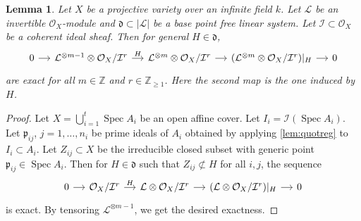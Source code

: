 \documentclass[12pt]{amsart}
\theoremstyle{plain}
\newtheorem{lemma}[theorem]{Lemma}
\theoremstyle{definition}
\numberwithin{equation}{section}
\def\Z{{\mathbb Z}}
\def\p{{ \mathfrak{p}}}
\def\dd{{ \mathfrak{d}}}
\def\O{{ \mathcal{O}}}
\def\I{{ \mathcal{I}}}
\DeclareMathOperator{\Spec}{Spec}
\begin{document}
\begin{lemma}\label{lem:generalhpsecexact}
Let $X$ be a projective variety over an infinite field $k$.
Let $ \mathcal{L}$ be an invertible $\O_{X}$-module and
$\dd \subset | \mathcal{L}|$ be a base point free linear system.
Let $\I \subset \O_{X}$ be a coherent ideal sheaf.
Then for general $H \in \dd$, 
\begin{equation}
\begin{tikzcd}[column sep=small] 
0 \arrow[r] & \mathcal{L}^{\otimes m-1} \otimes \O_{X}/\I^{r} \arrow[r,"H"] &  \mathcal{L}^{\otimes m} \otimes \O_{X}/\I^{r}  \arrow[r] &
(\mathcal{L}^{\otimes m} \otimes \O_{X}/\I^{r} )|_{H} \arrow[r]& 0
\end{tikzcd}
\end{equation}
are exact for all $m \in \Z$ and $r \in \Z_{\geq 1}$.
Here the second map is the one induced by $H$.
\end{lemma}
\begin{proof}
Let $X = \bigcup_{i=1}^{t}\Spec A_{i}$ be an open affine cover.
Let $I_{i} = \I(\Spec A_{i})$.
Let $\p_{ij}$, $j=1,\dots, n_{i}$ be prime ideals of $A_{i}$ obtained by
applying \cref{lem:quotreg} to $I_{i} \subset A_{i}$.
Let $Z_{ij} \subset X$ be the irreducible closed subset with generic point $\p_{ij} \in \Spec A_{i}$.
Then for $H \in \dd$ such that $Z_{ij} \not\subset H$ for all $i,j$, the sequence
\begin{equation}
\begin{tikzcd}[column sep=small] 
0 \arrow[r] &  \O_{X}/\I^{r} \arrow[r,"H"] &  \mathcal{L} \otimes \O_{X}/\I^{r}  \arrow[r] &
(\mathcal{L}\otimes \O_{X}/\I^{r} )|_{H} \arrow[r]& 0
\end{tikzcd}
\end{equation}
is exact.
By tensoring $ \mathcal{L}^{\otimes m-1}$, we get the desired exactness.
\end{proof}
\end{document}
